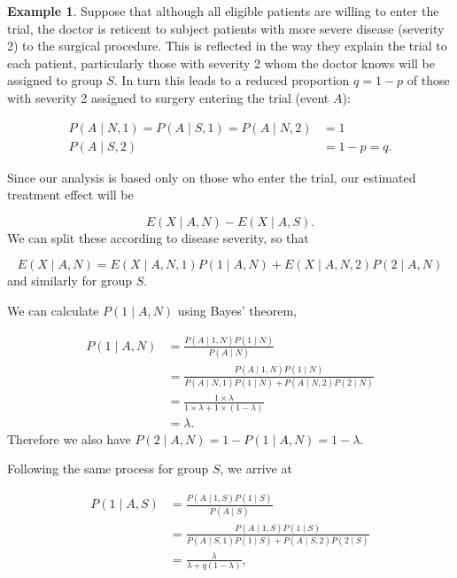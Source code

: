 \documentclass[
  openany]{book}
\theoremstyle{definition}
\theoremstyle{definition}
\newtheorem{example}{Example}[chapter]
\theoremstyle{definition}
\theoremstyle{definition}
\theoremstyle{remark}
\begin{document}
\begin{example}
Suppose that although all eligible patients are willing to enter the trial, the doctor is reticent to subject patients with more severe disease (severity 2) to the surgical procedure. This is reflected in the way they explain the trial to each patient, particularly those with severity 2 whom the doctor knows will be assigned to group \(S\). In turn this leads to a reduced proportion \(q = 1-p\) of those with severity 2 assigned to surgery entering the trial (event \(A\)):

\begin{align*}
P\left(A\mid{N,1}\right) = P\left(A\mid{S,1}\right) = P\left(A\mid{N,2}\right) & = 1 \\
P\left(A\mid{S,2}\right) & = 1-p = q.
\end{align*}

Since our analysis is based only on those who enter the trial, our estimated treatment effect will be

\[E\left(X\mid{A, N}\right) - E\left(X\mid{A, S}\right). \]
We can split these according to disease severity, so that

\[E\left(X\mid{A,N}\right) = E\left(X\mid{A,N,1}\right)P\left(1\mid{A,N}\right) + E\left(X\mid{A,N,2}\right)P\left(2\mid{A,N}\right) \]
and similarly for group \(S\).

We can calculate \(P\left(1\mid{A,N}\right)\) using Bayes' theorem,

\begin{align*}
P\left(1\mid{A,N}\right) & =  \frac{P\left(A\mid{1,N}\right)P\left(1\mid{N}\right)}{P\left(A\mid{N}\right)}\\
& = \frac{P\left(A\mid{1,N}\right)P\left(1\mid{N}\right)}{P\left(A\mid{N,1}\right)P\left(1\mid{N}\right) + P\left(A\mid{N,2}\right)P\left(2\mid{N}\right)} \\
&= \frac{1\times{\lambda}}{1\times {\lambda} + 1 \times{\left(1-\lambda\right)}}\\
& = \lambda.
\end{align*}
Therefore we also have \(P\left(2\mid{A,N}\right) = 1 -P\left(1\mid{A,N}\right) = 1-\lambda\).

Following the same process for group \(S\), we arrive at

\begin{align*}
P\left(1\mid{A,S}\right) & =  \frac{P\left(A\mid{1,S}\right)P\left(1\mid{S}\right)}{P\left(A\mid{S}\right)}\\
& = \frac{P\left(A\mid{1,S}\right)P\left(1\mid{S}\right)}{P\left(A\mid{S,1}\right)P\left(1\mid{S}\right) + P\left(A\mid{S,2}\right)P\left(2\mid{S}\right)} \\
& = \frac{\lambda}{\lambda + q\left(1-\lambda\right)},
\end{align*}


\end{example}
\end{document}
